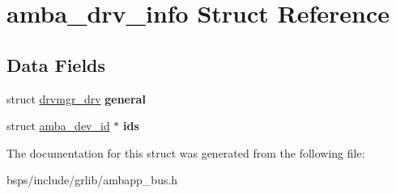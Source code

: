 \hypertarget{structamba__drv__info}{}\section{amba\+\_\+drv\+\_\+info Struct Reference}
\label{structamba__drv__info}
\subsection*{Data Fields}
\begin{DoxyCompactItemize}
\item 
\mbox{\label{structamba__drv__info_a924f4c2306ac6eaab228c57e54367ad9}} 
struct \mbox{\hyperlink{structdrvmgr__drv}{drvmgr\+\_\+drv}} {\bfseries general}
\item 
\mbox{\label{structamba__drv__info_a01913f06bd5c01d694a50635d469bea8}} 
struct \mbox{\hyperlink{structamba__dev__id}{amba\+\_\+dev\+\_\+id}} $\ast$ {\bfseries ids}
\end{DoxyCompactItemize}


The documentation for this struct was generated from the following file\+:\begin{DoxyCompactItemize}
\item 
bsps/include/grlib/ambapp\+\_\+bus.\+h\end{DoxyCompactItemize}
